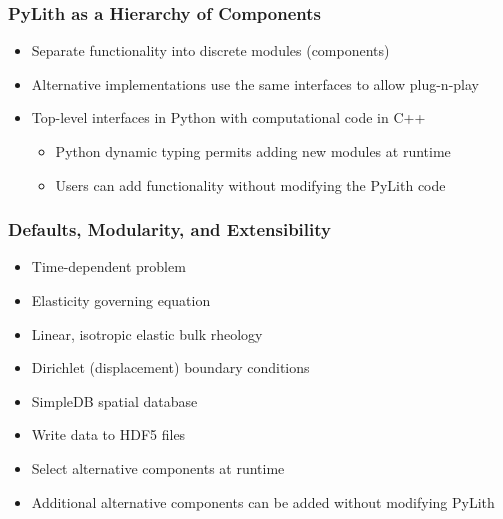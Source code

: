 \documentclass[aspectratio=169]{beamer}
\begin{document}
\begin{frame}
  \frametitle{PyLith as a Hierarchy of Components}

  \begin{minipage}{0.53\textwidth}
    \begin{itemize}
    \item Separate functionality into discrete modules (components)
    \item Alternative implementations use the same interfaces to allow plug-n-play
    \item Top-level interfaces in Python with computational code in C++
      \begin{itemize}
      \item Python dynamic typing permits adding new modules at runtime
      \item Users can add functionality without modifying the PyLith code
      \end{itemize}
    \end{itemize}
  \end{minipage}\hfill
  \begin{minipage}{0.43\textwidth}
  \end{minipage}

\end{frame}


\begin{frame}
  \frametitle{Defaults, Modularity, and Extensibility}
  \summary{}

  \begin{itemize}
    \begin{itemize}
    \item Time-dependent problem
    \item Elasticity governing equation
    \item Linear, isotropic elastic bulk rheology
    \item Dirichlet (displacement) boundary conditions
    \end{itemize}
    \begin{itemize}
    \item SimpleDB spatial database
    \item Write data to HDF5 files
    \end{itemize}
    \begin{itemize}
    \item Select alternative components at runtime
    \item Additional alternative components can be added without modifying PyLith
    \end{itemize}
  \end{itemize}
  
\end{frame}
\end{document}

